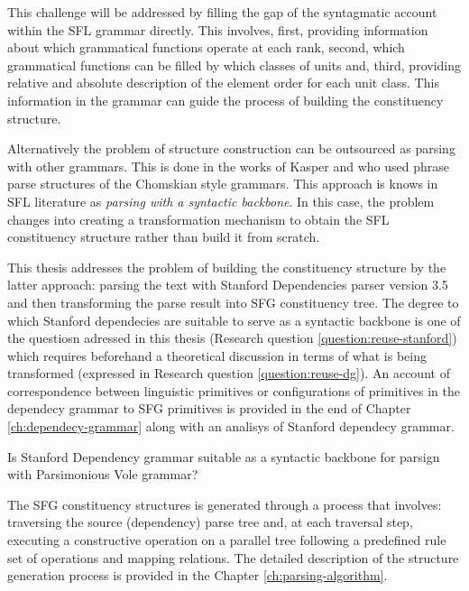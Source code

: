 This challenge will be addressed by filling the gap of the syntagmatic account within the SFL grammar directly. This involves, first, providing information about which grammatical functions operate at each rank, second, which grammatical functions can be filled by which classes of units and, third, providing relative and absolute description of the element order for each unit class. This information in the grammar can guide the process of building the constituency structure. 

Alternatively the problem of structure construction can be outsourced as parsing with other grammars. This is done in the works of Kasper \citet{Kasper1988} and \citet{Honnibal2004a, Honnibal2007} who used phrase parse structures of the Chomskian style grammars. This approach is knows in SFL literature as \textit{parsing with a syntactic backbone}. In this case, the problem changes into creating a transformation mechanism to obtain the SFL constituency structure rather than build it from scratch. 


This thesis addresses the problem of building the constituency structure by the latter approach: parsing the text with Stanford Dependencies parser version 3.5 \citep{Marneffe2008a,Marneffe2008, Marneffe2014} and then transforming the parse result into SFG constituency tree. The degree to which Stanford dependecies are suitable to serve as a syntactic backbone is one of the questiosn adressed in this thesis (Research question \ref{question:reuse-stanford}) which requires beforehand a theoretical discussion in terms of what is being transformed (expressed in Research question \ref{question:reuse-dg}). An account of correspondence between linguistic primitives or configurations of primitives in the dependecy grammar to SFG primitives is provided in the end of Chapter \ref{ch:dependecy-grammar} along with an analisys of Stanford dependecy grammar. 

\begin{question}\label{question:reuse-stanford}
    Is Stanford Dependency grammar suitable as a syntactic backbone for parsign with Parsimonious Vole grammar?
\end{question}

The SFG constituency structures is generated through a process that involves: traversing the source (dependency) parse tree and, at each traversal step, executing a constructive operation on a parallel tree following a predefined rule set of operations and mapping relations. The detailed description of the structure generation process is provided in the Chapter \ref{ch:parsing-algorithm}. 

